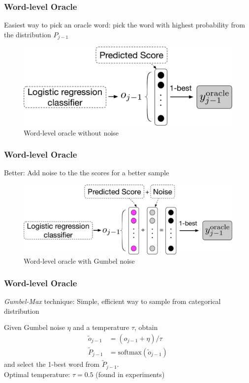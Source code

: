 \documentclass{beamer}
\begin{document}
\begin{frame}
    \frametitle{Word-level Oracle}
    Easiest way to pick an oracle word: pick the word with highest probability from the distribution $P_{j-1}$
    \begin{figure}
        \centering
        \includegraphics[width=\textwidth]{fig/wonoise.pdf}
        \caption{Word-level oracle without noise}
    \end{figure}
\end{frame}


\begin{frame}
    \frametitle{Word-level Oracle}
    Better: Add noise to the the scores for a better sample
    \begin{figure}
        \centering
        \includegraphics[width=\textwidth]{fig/oracle_noise.pdf}
        \caption{Word-level oracle with Gumbel noise}
    \end{figure}
\end{frame}


\begin{frame}
    \frametitle{Word-level Oracle}
    \begin{exampleblock}{\emph{Gumbel-Max} technique:}
        Simple, efficient way to sample from categorical distribution
    \end{exampleblock}
    \bigskip
    Given Gumbel noise $\eta$ and a temperature $\tau$, obtain
    \begin{align}
        \tilde{o}_{j-1} &= \left(o_{j-1} + \eta\right)/\tau\\
        \tilde{P}_{j-1} &= \mathrm{softmax}(\tilde{o}_{j-1})
    \end{align}
    and select the 1-best word from $\tilde{P}_{j-1}$.\\
    \bigskip
    Optimal temperature: $\tau = 0.5$ (found in experiments)
\end{frame}
\end{document}
